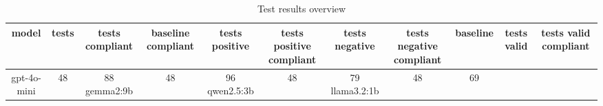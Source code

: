 
  \begin{table}[h!]
  \centering
  \begin{tabular}{|c|c|c|c|c|c|c|c|c|c|c|}
  \hline
  model & tests & tests compliant & baseline compliant & tests positive & tests positive compliant & tests negative & tests negative compliant & baseline & tests valid & tests valid compliant \\
  \hline
  gpt-4o-mini & 48 & 88%
\hline
gemma2:9b & 48 & 96%
\hline
qwen2.5:3b & 48 & 79%
\hline
llama3.2:1b & 48 & 69%
  \end{tabular}
  \caption{Test results overview}
  
  \end{table}
  